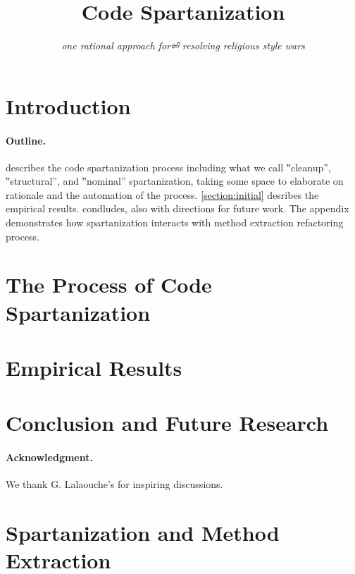 \documentclass[preprint,10pt,nonatbib]{sigplanconf}
\title{Code Spartanization}
\subtitle{\scriptsize \emph{one rational approach for⏎ resolving religious style wars}}
\begin{document}
\maketitle

\def\ignore#1{}
\def\gal{\marginpar[G$⇒$]{$⇐$G}}
\def\yossi{\marginpar[Y$⇒$]{$⇐$Y}}
\def\matteo{\marginpar[M$⇒$]{$⇐$M}}

\begin{abstract}
  
\end{abstract}

\section{Introduction}


\paragraph{Outline.}  describes the code spartanization
process including what we call ‟cleanup”, ‟structural”, and ‟nominal”
spartanization, taking some space to elaborate on rationale and the automation
of the process. \cref{section:initial} desribes the empirical results.
 condludes, also with directions for future work.  The
appendix demonstrates how spartanization interacts with method extraction
refactoring process. 

\section{The Process of Code Spartanization}
\label{section:process}


\section{Empirical Results}
\label{section:empirical}


\section{Conclusion and Future Research}
\label{section:zz}


\paragraph{Acknowledgment.} We thank G. Lalaouche's for inspiring discussions.

\balance
\small


\eject
\appendix
\section{Spartanization and Method Extraction}
\label{section:techniques}


%
\end{document}
